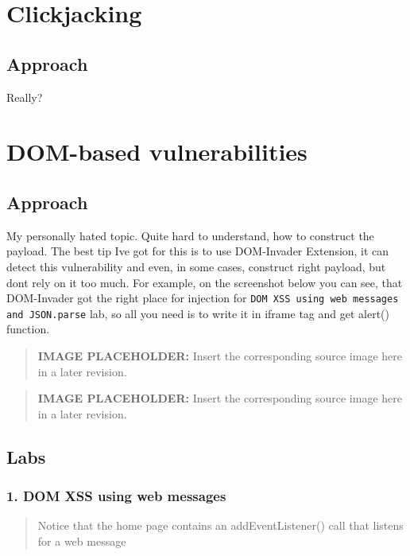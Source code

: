 \documentclass[
  letterpaper,
]{article}
\newcommand{\passthrough}[1]{#1}
\begin{document}
\section{Clickjacking}\label{clickjacking}

\subsection{Approach}\label{approach-3}

Really?

\section{DOM-based vulnerabilities}\label{dom-based-vulnerabilities}

\subsection{Approach}\label{approach-4}

My personally hated topic. Quite hard to understand, how to construct
the payload. The best tip I\textquotesingle ve got for this is to use
DOM-Invader Extension, it can detect this vulnerability and even, in
some cases, construct right payload, but don\textquotesingle t rely on
it too much. For example, on the screenshot below you can see, that
DOM-Invader got the right place for injection for
\passthrough{\lstinline!DOM XSS using web messages and JSON.parse!} lab,
so all you need is to write it in iframe tag and get alert() function.\\
\begin{quote}
\textbf{IMAGE PLACEHOLDER:} Insert the corresponding source image here in a later revision.
\end{quote}
\begin{quote}
\textbf{IMAGE PLACEHOLDER:} Insert the corresponding source image here in a later revision.
\end{quote}
\subsection{Labs}\label{labs-3}

\subsubsection{1. DOM XSS using web
messages}\label{1-dom-xss-using-web-messages}

\begin{quote}
Notice that the home page contains an addEventListener() call that
listens for a web message
\end{quote}
\end{document}

